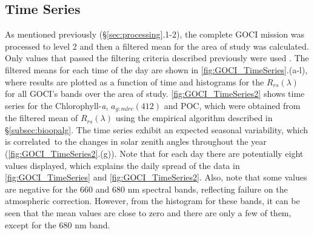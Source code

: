 \documentclass[onecolumn,3p,letterpaper,11pt]{elsarticle}
\begin{document}
\subsection{Time Series}
As mentioned previously (\S\ref{sec:processing}.1-2), the complete GOCI mission was processed to level 2 and then a filtered mean for the area of study was calculated. Only values that passed the filtering criteria described previously were used \citep{Bailey2006}. The filtered means for each time of the day are shown in \autoref{fig:GOCI_TimeSeries}.(a-l), where results are plotted as a function of time and histograms for the $R_{rs}(\lambda)$ for all GOCI's bands over the area of study. \autoref{fig:GOCI_TimeSeries2} shows time series for the Chlorophyll-{\it a}, $a_{g:mlrc}(412)$ and POC, which were obtained from the filtered mean of $R_{rs}(\lambda)$ using the empirical algorithm described in \S\ref{subsec:bioopalg}. The time series exhibit an expected seasonal variability, which is correlated~to the changes in solar zenith angles throughout the year (\autoref{fig:GOCI_TimeSeries2}.(g)). Note that for each day there are potentially eight values displayed, which explains the daily spread of the data in \autoref{fig:GOCI_TimeSeries} and \autoref{fig:GOCI_TimeSeries2}. Also, note that some values are negative for the 660 and 680 nm spectral bands, reflecting failure on the atmospheric correction. However, from the histogram for these bands, it can be seen that the mean values are close to zero and there are only a few of them, except for the 680 nm band.
\end{document}
